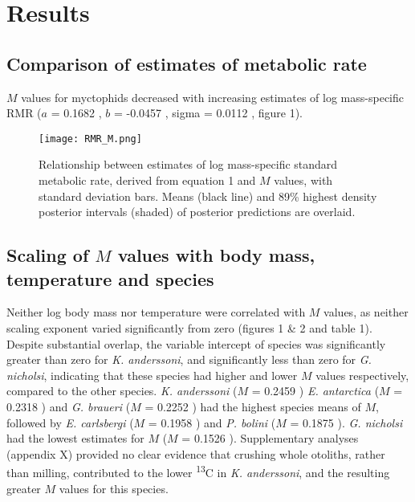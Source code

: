 \documentclass[12pt, titlepage]{article}
\begin{document}
\section{Results}

\subsection{Comparison of estimates of metabolic rate}

$M$ values for myctophids decreased with increasing estimates of log mass-specific RMR ($a$ = 0.1682 , $b$ = -0.0457 , sigma = 0.0112 , figure 1). 


\begin{figure}[H]
\texttt{[image: RMR\_M.png]}
\caption{Relationship between estimates of log mass-specific standard metabolic rate, derived from equation 1 and $M$ values, with standard deviation bars. Means (black line) and 89\% highest density posterior intervals (shaded) of posterior predictions are overlaid.} %
\end{figure}

\pagebreak
\subsection{Scaling of $M$ values with body mass, temperature and species}

Neither log body mass nor temperature were correlated with $M$ values, as neither scaling exponent varied significantly from zero (figures 1 \& 2 and table 1).
Despite substantial overlap, the variable intercept of species was significantly greater than zero for \textit{K. anderssoni}, and significantly less than zero for \textit{G. nicholsi}, indicating that these species had higher and lower $M$ values respectively, compared to the other species.
\textit{K. anderssoni} ($M$ = 0.2459 ) \textit{E. antarctica} ($M$ = 0.2318 ) and \textit{G. braueri} ($M$ = 0.2252 ) had the highest species means of $M$, followed by \textit{E. carlsbergi} ($M$ = 0.1958 ) and \textit{P. bolini} ($M$ = 0.1875 ).
\textit{G. nicholsi} had the lowest estimates for $M$ ($M$ = 0.1526 ).
Supplementary analyses (appendix X) %
provided no clear evidence that crushing whole otoliths, rather than milling, contributed to the lower \textdelta \textsuperscript{13}C in \textit{K. anderssoni}, and the resulting greater $M$ values for this species.
\end{document}
